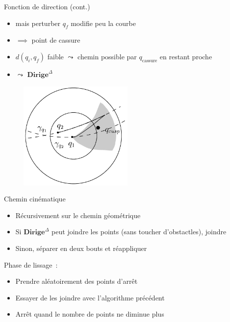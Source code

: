 \documentclass[11pt]{beamer}
\newcommand{\steer}{\textbf{Dirige}}
\newcommand{\steerflat}{\steer^\Delta}
\newcommand{\qcusp}{q_{\text{cassure}}}
\begin{document}
\begin{frame}{Fonction de direction (cont.)}
	\begin{itemize}
		\item mais perturber $q_f$ modifie peu la courbe
		\item[~] $\implies$ point de cassure
		\item $d(q_i, q_f)$ faible $\leadsto$ chemin possible par
			$\qcusp$ en restant proche
		\item $\leadsto$ $\steerflat$
	\end{itemize}

	\vspace{-3em}
	\begin{figure}
		\flushright{}
		\includegraphics[width=0.5\textwidth]{img/steer.png}
	\end{figure}
\end{frame}

\begin{frame}{Chemin cinématique}
	\begin{itemize}
		\item Récursivement sur le chemin géométrique
		\item Si $\steerflat$ peut joindre les points (sans toucher
			d'obstactles), joindre
		\item Sinon, séparer en deux bouts et réappliquer
	\end{itemize}

	\vspace{1em}

	Phase de lissage~:

	\begin{itemize}
		\item Prendre aléatoirement des points d'arrêt
		\item Essayer de les joindre avec l'algorithme précédent
		\item Arrêt quand le nombre de points ne diminue plus
	\end{itemize}
\end{frame}
\end{document}
